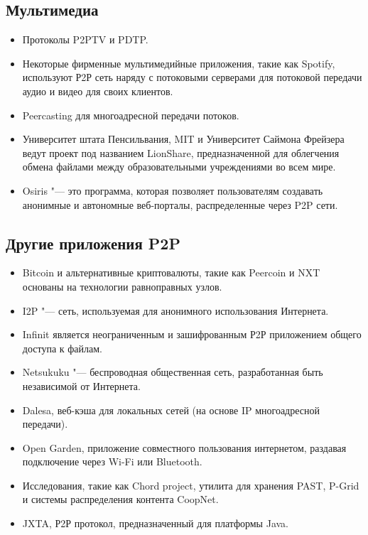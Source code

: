 \documentclass[bachelor, och, coursework]{SCWorks}
\begin{document}
\subsection{Мультимедиа}
\begin{itemize}
    \item Протоколы P2PTV и PDTP.
    \item Некоторые фирменные мультимедийные приложения, такие как Spotify, используют Р2Р сеть наряду с потоковыми серверами для потоковой передачи аудио и видео для своих клиентов.
    \item Peercasting для многоадресной передачи потоков.
    \item Университет штата Пенсильвания, MIT и Университет Саймона Фрейзера ведут проект под названием LionShare, предназначенной для облегчения обмена файлами между образовательными учреждениями во всем мире.
    \item Osiris "--- это программа, которая позволяет пользователям создавать анонимные и автономные веб-порталы, распределенные через P2P сети.
\end{itemize}
\subsection{Другие приложения P2P}
\begin{itemize}
    \item Bitcoin и альтернативные криптовалюты, такие как Peercoin и NXT основаны на технологии равноправных узлов.
    \item I2P "--- сеть, используемая для анонимного использования Интернета.
    \item Infinit является неограниченным и зашифрованным Р2Р приложением общего доступа к файлам.
    \item Netsukuku "--- беспроводная общественная сеть, разработанная быть независимой от Интернета.
    \item Dalesa, веб-кэша для локальных сетей (на основе IP многоадресной передачи).
    \item Open Garden, приложение совместного пользования интернетом, раздавая подключение через Wi-Fi или Bluetooth.
    \item Исследования, такие как Chord project, утилита для хранения PAST, P-Grid и системы распределения контента CoopNet.
    \item JXTA, Р2Р протокол, предназначенный для платформы Java.
\end{itemize}



\conclusion



\end{document}
